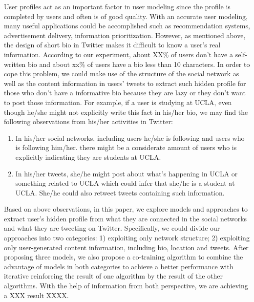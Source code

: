 User profiles act as an important factor in user modeling since the profile is completed by users and often is of good quality. With an accurate user modeling, many useful applications could be accomplished such as recommendation systems, advertisement delivery, information prioritization. However, as mentioned above, the design of short bio in Twitter makes it difficult to know a user's real information. According to our experiment, about XX\% of users don't have a self-written bio and about xx\% of users have a bio less than 10 characters. In order to cope this problem, we could make use of the structure of the social network as well as the content information in users' tweets to extract such hidden profile for those who don't have a informative bio because they are lazy or they don't want to post those information. For example, if a user is studying at UCLA, even though he/she might not explicitly write this fact in his/her bio, we may find the following observations from his/her activities in Twitter:

\begin{enumerate}

\item In his/her social networks, including users he/she is following and users who is following him/her. there might be a considerate amount of users who is explicitly indicating they are students at UCLA. 
\item In his/her tweets, she/he might post about what's happening in UCLA or something related to UCLA which could infer that she/he is a student at UCLA. She/he could also retweet tweets containing such information.

\end{enumerate}

Based on above observations, in this paper, we explore models and approaches to extract user's hidden profile from what they are connected in the social networks and what they are tweeting on Twitter. Specifically, we could divide our approaches into two categories: 1) exploiting only network structure; 2) exploiting only user-generated content information, including bio, location and tweets. After proposing three models, we also propose a co-training algorithm to combine the advantage of models in both categories to achieve a better performance with iterative reinforcing the result of one algorithm by the result of the other algorithms. With the help of information from both perspective, we are achieving a XXX result XXXX. 


